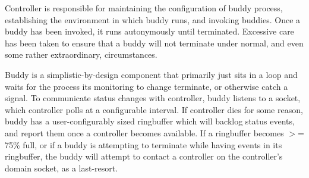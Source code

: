 Controller is responsible for maintaining the configuration of buddy process, establishing the environment in which buddy runs, and invoking buddies. Once a buddy has been invoked, it runs autonymously until terminated. Excessive care has been taken to ensure that a buddy will not terminate under normal, and even some rather extraordinary, circumstances.

Buddy is a simplistic-\/by-\/design component that primarily just sits in a loop and waits for the process its monitoring to change terminate, or otherwise catch a signal. To communicate status changes with controller, buddy listens to a socket, which controller polls at a configurable interval. If controller dies for some reason, buddy has a user-\/configurably sized ringbuffer which will backlog status events, and report them once a controller becomes available. If a ringbuffer becomes $>$= 75\% full, or if a buddy is attempting to terminate while having events in its ringbuffer, the buddy will attempt to contact a controller on the controller's domain socket, as a last-\/resort.

